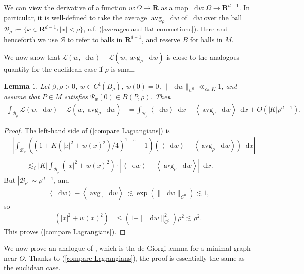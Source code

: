 \documentclass[reqno,11pt]{amsart}
\newcommand{\RR}{\mathbf{R}}
\DeclareMathOperator{\avg}{avg}
\newcommand*\dif{\mathop{}\!\mathrm{d}}
\newcommand{\Lagrange}{\mathscr L}
\def\Japan#1{\left \langle #1 \right \rangle}
\newtheorem{lemma}[theorem]{Lemma}
\theoremstyle{definition}
\numberwithin{equation}{section}
\begin{document}
We can view the derivative of a function $w: \Omega \to \RR$ as a map $\dif w: \Omega \to \RR^{d - 1}$.
In particular, it is well-defined to take the average $\avg_\rho \dif w$ of $\dif w$ over the ball $\mathscr B_\rho := \{x \in \RR^{d - 1}: |x| < \rho\}$, c.f. (\ref{averages and flat connections}).
Here and henceforth we use $\mathscr B$ to refer to balls in $\RR^{d - 1}$, and reserve $B$ for balls in $M$.

We now show that $\Lagrange(w, \dif w) - \Lagrange(w, \avg_\rho \dif w)$ is close to the analogous quantity for the euclidean case if $\rho$ is small.

\begin{lemma}
Let $\beta, \rho > 0$, $w \in C^1(B_\rho)$, $w(0) = 0$, $\|\dif w\|_{C^0} \ll_{c_0, K} 1$, and assume that $P \in M$ satisfies $\Psi_w(0) \in B(P, \rho)$. Then
\begin{align}
\int_{\mathscr B_\rho} \Lagrange(w, \dif w) - \Lagrange(w, \avg_\rho \dif w)
&= \int_{\mathscr B_\rho} \Japan{\dif w} \dif x - \Japan{\avg_\rho \dif w} \dif x + O(|K| \rho^{d + 1}) \label{compare Lagrangians}.
\end{align}
\end{lemma}
\begin{proof}
The left-hand side of (\ref{compare Lagrangians}) is
\begin{align*}
&\left|\int_{\mathscr B_\rho} ((1 + K(|x|^2 + w(x)^2)/4)^{1 - d} - 1)(\Japan{\dif w} - \Japan{\avg_\rho \dif w}) \dif x\right| \\
&\qquad \lesssim_d |K| \int_{\mathscr B_\rho} (|x|^2 + w(x)^2) \cdot \left|\Japan{\dif w} - \Japan{\avg_\rho \dif w}\right| \dif x.
\end{align*}
But $|\mathscr B_\rho| \sim \rho^{d - 1}$, and
$$|\Japan{\dif w} - \Japan{\avg_\rho \dif w}| \lesssim \exp(\|\dif w\|_{C^0}) \lesssim 1,$$
so
\begin{align*}
(|x|^2 + w(x)^2) &\leq (1 + \|\dif w\|_{C^0}^2) \rho^2 \lesssim \rho^2.
\end{align*}
This proves (\ref{compare Lagrangians}).
\end{proof}

We now prove an analogue of \cite[Lemma 6.3]{Giusti77}, which is the de Giorgi lemma for a minimal graph near $O$.
Thanks to (\ref{compare Lagrangians}), the proof is essentially the same as the euclidean case.
\end{document}
